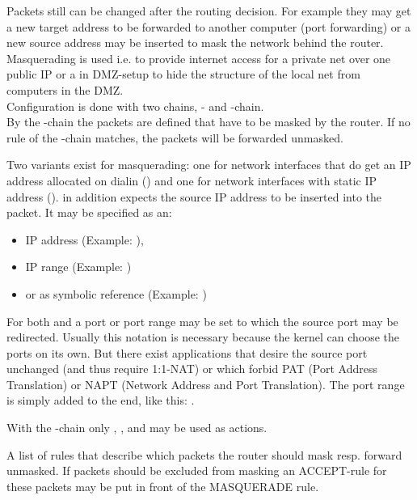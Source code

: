 Packets still can be changed after the routing decision. For example they
may get a new target address to be forwarded to another computer (port
forwarding) or a new source address may be inserted to mask the network
behind the router. Masquerading is used i.e. to provide internet access
for a private net over one public IP or a in DMZ-setup to hide the structure
of the local net from computers in the DMZ.\\

Configuration is done with two chains, - and
-chain.\\
By the -chain the
packets are defined that have to be masked by the router. If no rule of
the -chain matches, the packets will be forwarded unmasked. 

Two variants exist for masquerading: one for network interfaces that do
get an IP address allocated on dialin () and one for
network interfaces  with static IP address (). 
in addition expects the source IP address to be inserted into the packet.
It may be specified as an:
\begin{itemize}
\item IP address (Example: ),
\item IP range (Example: )
\item or as symbolic reference (Example:
)
\end{itemize}

For both  and  a port or port range
may be set to which the source port may be redirected. Usually this notation is
necessary because the kernel can choose the ports on its own. But there exist
applications that desire the source port unchanged (and thus require 1:1-NAT) or
which forbid PAT (Port Address Translation) or NAPT (Network Address and Port
Translation). The port range is simply added to the end, like this:
.

With the -chain only , ,
 and  may be used as actions.

\begin{description}

\mbox{}\newline
A list of rules that describe which packets the router should mask
resp. forward unmasked. If packets should be excluded from masking
an ACCEPT-rule for these packets may be put in front of the 
MASQUERADE rule.

\end{description}

